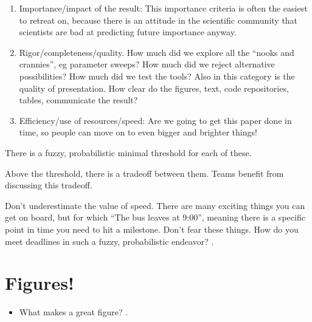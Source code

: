 \documentclass[letterpaper,10pt,english]{sphinxmanual}
\let\sphinxpxdimen\pdfpxdimen\else\newdimen\sphinxpxdimen
\begin{document}
\noindent\sphinxincludegraphics[width=400\sphinxpxdimen]{{fig3way}.pdf}
\begin{enumerate}
%
\item {} 
\sphinxAtStartPar
Importance/impact of the result: This importance criteria is often the easiest to retreat on, because there is an attitude in the scientific community that scientists are bad at predicting future importance anyway.

\item {} 
\sphinxAtStartPar
Rigor/completeness/quality. How much did we explore all the “nooks and crannies”, eg parameter sweeps? How much did we reject alternative possibilities? How much did we test the tools? Also in this category is the quality of presentation. How clear do the figures, text, code repositories, tables, communicate the result?

\item {} 
\sphinxAtStartPar
Efficiency/use of resources/speed: Are we going to get this paper done in time, so people can move on to even bigger and brighter things!

\end{enumerate}

\sphinxAtStartPar
There is a fuzzy, probabilistic minimal threshold for each of these.

\sphinxAtStartPar
Above the threshold, there is a trade\sphinxhyphen{}off between them. Teams benefit from discussing this trade\sphinxhyphen{}off.

\sphinxAtStartPar
Don’t underestimate the value of speed. There are many exciting things you can get on board, but for which “The bus leaves at 9:00”, meaning there is a specific point in time you need to hit a milestone. Don’t fear these things. How do you meet deadlines in such a fuzzy, probabilistic endeavor? {\hyperref[\detokenize{03DevOps:devops}]{}}.


\section{Figures!}
\label{\detokenize{02Elements:figures}}\begin{itemize}
\item {} 
\sphinxAtStartPar
What makes a great figure? .

\end{itemize}
\end{document}
